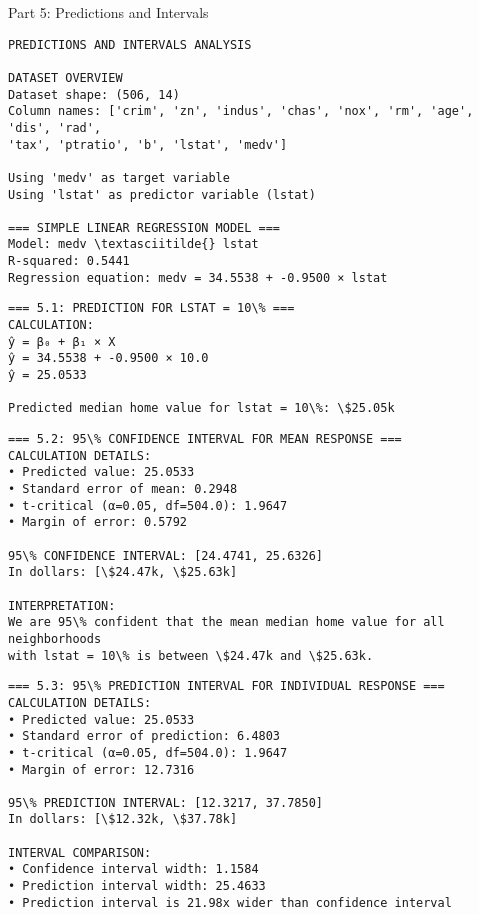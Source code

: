 \documentclass[11pt, twocolumn]{article}
\begin{document}
    Part 5: Predictions and Intervals

    \begin{Verbatim}[commandchars=\\\{\}]
PREDICTIONS AND INTERVALS ANALYSIS

DATASET OVERVIEW
Dataset shape: (506, 14)
Column names: ['crim', 'zn', 'indus', 'chas', 'nox', 'rm', 'age', 'dis', 'rad',
'tax', 'ptratio', 'b', 'lstat', 'medv']

Using 'medv' as target variable
Using 'lstat' as predictor variable (lstat)

=== SIMPLE LINEAR REGRESSION MODEL ===
Model: medv \textasciitilde{} lstat
R-squared: 0.5441
Regression equation: medv = 34.5538 + -0.9500 × lstat

    \end{Verbatim}

    \begin{Verbatim}[commandchars=\\\{\}]
=== 5.1: PREDICTION FOR LSTAT = 10\% ===
CALCULATION:
ŷ = β₀ + β₁ × X
ŷ = 34.5538 + -0.9500 × 10.0
ŷ = 25.0533

Predicted median home value for lstat = 10\%: \$25.05k

    \end{Verbatim}

    \begin{Verbatim}[commandchars=\\\{\}]
=== 5.2: 95\% CONFIDENCE INTERVAL FOR MEAN RESPONSE ===
CALCULATION DETAILS:
• Predicted value: 25.0533
• Standard error of mean: 0.2948
• t-critical (α=0.05, df=504.0): 1.9647
• Margin of error: 0.5792

95\% CONFIDENCE INTERVAL: [24.4741, 25.6326]
In dollars: [\$24.47k, \$25.63k]

INTERPRETATION:
We are 95\% confident that the mean median home value for all neighborhoods
with lstat = 10\% is between \$24.47k and \$25.63k.

    \end{Verbatim}

    \begin{Verbatim}[commandchars=\\\{\}]
=== 5.3: 95\% PREDICTION INTERVAL FOR INDIVIDUAL RESPONSE ===
CALCULATION DETAILS:
• Predicted value: 25.0533
• Standard error of prediction: 6.4803
• t-critical (α=0.05, df=504.0): 1.9647
• Margin of error: 12.7316

95\% PREDICTION INTERVAL: [12.3217, 37.7850]
In dollars: [\$12.32k, \$37.78k]

INTERVAL COMPARISON:
• Confidence interval width: 1.1584
• Prediction interval width: 25.4633
• Prediction interval is 21.98x wider than confidence interval

    \end{Verbatim}
\end{document}
